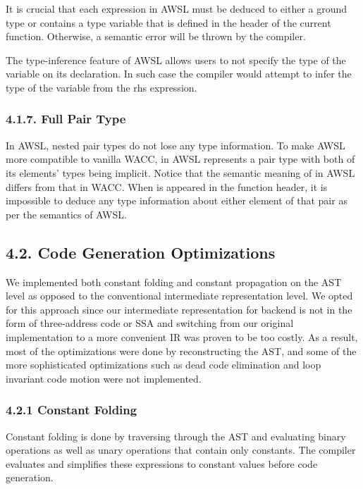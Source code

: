 \documentclass[10pt,a4paper,]{report}
\begin{document}
  It is crucial that each expression in AWSL must be deduced to either a ground
  type or contains a type variable that is defined in the header of the current
  function. Otherwise, a semantic error will be thrown by the compiler.

  The type-inference feature of AWSL allows users to not specify the type of the
  variable on its declaration. In such case the compiler would attempt to infer
  the type of the variable from the rhs expression.

  \subsubsection*{4.1.7. Full Pair Type}
  In AWSL, nested pair types do not lose any type information. To make AWSL more
  compatible to vanilla WACC,  in AWSL represents a pair type with
  both of its elements' types being implicit. Notice that the semantic meaning of
   in AWSL differs from that in WACC. When  is
  appeared in the function header, it is impossible to deduce any type
  information about either element of that pair as per the semantics of AWSL.

  \subsection*{4.2. Code Generation Optimizations}
  We implemented both constant folding and constant propagation on the AST level
  as opposed to the conventional intermediate representation level. We opted for
  this approach since our intermediate representation for backend is not in the
  form of three-address code or SSA and switching from our original
  implementation to a more convenient IR was proven to be too costly. As a
  result, most of the optimizations were done by reconstructing the AST, and
  some of the more sophisticated optimizations such as dead code elimination and
  loop invariant code motion were not implemented.

  \subsubsection*{4.2.1	Constant Folding}
  Constant folding is done by traversing through the AST and evaluating binary
  operations as well as unary operations that contain only constants.
  The compiler evaluates and simplifies these expressions to constant values
  before code generation.
\end{document}
